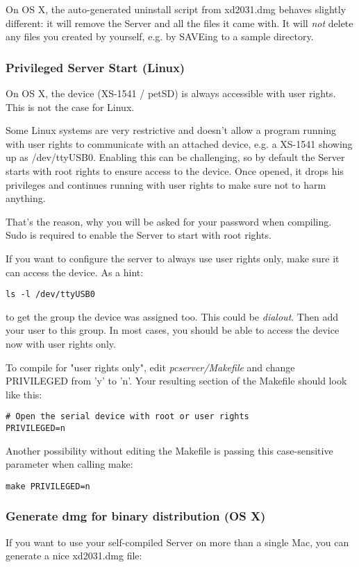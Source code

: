 On OS X, the auto-generated uninstall script from xd2031.dmg behaves
slightly different: it will remove the Server and all the files it came with. 
It will \textit{not} delete any files you created by yourself, e.g. by
SAVEing to a sample directory.

\subsubsection{Privileged Server Start (Linux)}
\label{rights}
On OS X, the device (XS-1541 / petSD) is always accessible with
user rights. This is not the case for Linux.

Some Linux systems are very restrictive and doesn't allow a program running
with user rights to communicate with an attached device, e.g. a XS-1541
showing up as /dev/ttyUSB0. Enabling this can be challenging, so by default
the Server starts with root rights to ensure access to the device.
Once opened, it drops his privileges and continues running with user rights
to make sure not to harm anything.

That's the reason, why you will be asked for your password when compiling.
Sudo is required to enable the Server to start with root rights.

If you want to configure the server to always use user rights only, make sure
it can access the device. As a hint:

\begin{verbatim}
ls -l /dev/ttyUSB0
\end{verbatim}

to get the group the device was assigned too. This could be \textit{dialout}.
Then add your user to this group. In most cases, you should be able to
access the device now with user rights only.

To compile for "user rights only", edit 
\textit{pcserver/Makefile} and change PRIVILEGED from 'y' to 'n'.
Your resulting section of the Makefile should look like this:

\begin{verbatim}
# Open the serial device with root or user rights
PRIVILEGED=n
\end{verbatim}

Another possibility without editing the Makefile is passing this
case-sensitive parameter when calling make:

\begin{verbatim}
make PRIVILEGED=n
\end{verbatim}

\subsubsection{Generate dmg for binary distribution (OS X)}
If you want to use your self-compiled Server on more than a single Mac,
you can generate a nice xd2031.dmg file:

